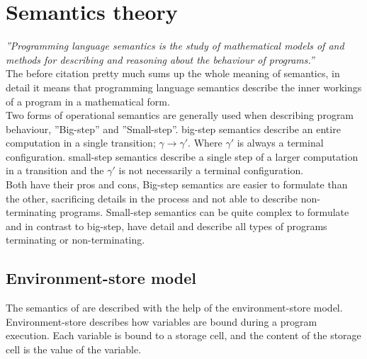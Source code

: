 \section{Semantics theory}\label{sec:semantic}
\emph{''Programming language semantics is the study of mathematical models of and methods for describing and reasoning about the behaviour of programs.''}\cite{transtrees}\\
The before citation pretty much sums up the whole meaning of semantics, in detail it means that programming language semantics describe the inner workings of a program in a mathematical form.\\
Two forms of operational semantics are generally used when describing program behaviour, ''Big-step'' and ''Small-step''.
big-step semantics describe an entire computation in a single transition;
$ \gamma \rightarrow \gamma' $.
Where $\gamma'$ is always a terminal configuration.
small-step semantics describe a single step of a larger computation in a transition and the $ \gamma' $ is not necessarily a terminal configuration.\\
Both have their pros and cons, Big-step semantics are easier to formulate than the other, sacrificing details in the process and not able to describe non-terminating programs. Small-step semantics can be quite complex to formulate and in contrast to big-step, have detail and describe all types of programs terminating or non-terminating.\cite{opsemantics}\cite{transtrees}

\subsection{Environment-store model}\label{subsec:env-sto}
The semantics of \langname{} are described with the help of the environment-store model. Environment-store describes how variables are bound during a program execution. Each variable is bound to a storage cell, and the content of the storage cell is the value of the variable.

